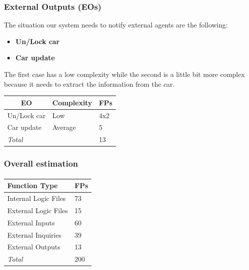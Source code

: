 \documentclass[english]{article}
\begin{document}
\subsubsection{External Outputs (EOs)}

The situation our system needs to notify external agents are the following:

\begin{itemize}
	\item{\textbf{Un/Lock car}}

	\item{\textbf{Car update}}
\end{itemize}

The first case has a low complexity while the second is a little bit more complex because it needs to extract the information from the car.

\begin{center}
	\begin{tabular}{ |p{8cm}|m{2cm}|p{1cm}| }
		\hline
		\multicolumn{1}{|c|}{\textbf{EO}} & \multicolumn{1}{c|}{\textbf{Complexity}} & \multicolumn{1}{c|}{\textbf{FPs}} \\
		\hline
		Un/Lock car & Low & 4x2 \\
		\hline
		Car update & Average & 5\\
		\hline
		\multicolumn{2}{|l|}{\textit{Total}} & \multicolumn{1}{l|}{13}\\
		\hline
	\end{tabular}
\end{center}

\subsubsection{Overall estimation}

\paragraph{}
\begin{center}
	\begin{tabular}{|p{5cm}|p{1cm}|}
		\hline
		\textbf{Function Type} & \textbf{FPs} \\
		\hline
		Internal Logic Files & 73 \\
		External Logic Files & 15 \\
		External Inputs & 60 \\
		External Inquiries & 39 \\
		External Outputs & 13 \\
		\hline
		\textit{Total} & 200 \\
		\hline
	\end{tabular}
\end{center}
\end{document}
